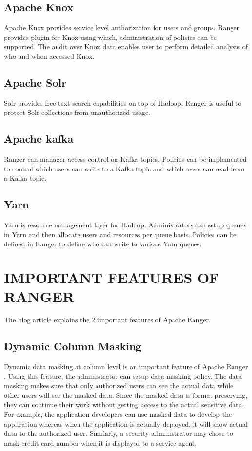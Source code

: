 \documentclass[9pt,twocolumn,twoside]{styles/osajnl}
\begin{document}
\subsection{Apache Knox}
Apache Knox provides service level authorization for users and groups. Ranger
 provides plugin for Knox using which, administration of policies can be
 supported. The audit over Knox data enables user to perform detailed
 analysis of who and when accessed Knox.

\subsection{Apache Solr}
Solr provides free text search capabilities on top of Hadoop. Ranger is
useful to protect Solr collections from unauthorized usage.

\subsection{Apache kafka}
Ranger can manager access control on Kafka topics. Policies can be
implemented to control which users can write to a Kafka topic and which users
can read from a Kafka topic.

\subsection{Yarn}
Yarn is resource management layer for Hadoop. Administrators can setup queues
 in Yarn and then allocate users and resources per queue basis. Policies can
 be defined in Ranger to define who can write to various Yarn queues.

\section{IMPORTANT FEATURES OF RANGER}
The blog article \cite{www-ranger-key-features} explains the 2 important
features of Apache Ranger.

\subsection{Dynamic Column Masking}
Dynamic data masking at column level is an important feature of Apache Ranger
. Using this feature, the administrator can setup data masking policy. The
data masking makes sure that only authorized users can see the actual data
while other users will see the masked data. Since the masked data is format
preserving, they can continue their work without getting access to the actual
 sensitive data. For example, the application developers can use masked data
 to develop the application whereas when the application is actually
 deployed, it will show actual data to the authorized user. Similarly, a
 security administrator may chose to mask credit card number when it is
 displayed to a service agent.
\end{document}

